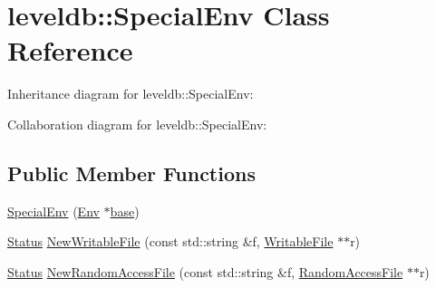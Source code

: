 \hypertarget{classleveldb_1_1_special_env}{}\section{leveldb\+:\+:Special\+Env Class Reference}
\label{classleveldb_1_1_special_env}


Inheritance diagram for leveldb\+:\+:Special\+Env\+:


Collaboration diagram for leveldb\+:\+:Special\+Env\+:
\subsection*{Public Member Functions}
\begin{DoxyCompactItemize}
\item 
\hyperlink{classleveldb_1_1_special_env_a29fed9502e35a1f9374e0f46f4bd1181}{Special\+Env} (\hyperlink{classleveldb_1_1_env}{Env} $\ast$\hyperlink{testharness_8cc_a70ff0f6c026c3dd1ef6aaf504e7fddc3}{base})
\item 
\hyperlink{classleveldb_1_1_status}{Status} \hyperlink{classleveldb_1_1_special_env_a2a8b88051ccc5f957321d47af0dae5ed}{New\+Writable\+File} (const std\+::string \&f, \hyperlink{classleveldb_1_1_writable_file}{Writable\+File} $\ast$$\ast$r)
\item 
\hyperlink{classleveldb_1_1_status}{Status} \hyperlink{classleveldb_1_1_special_env_ae04ba2b7b94753d805e316dbda74ec00}{New\+Random\+Access\+File} (const std\+::string \&f, \hyperlink{classleveldb_1_1_random_access_file}{Random\+Access\+File} $\ast$$\ast$r)
\end{DoxyCompactItemize}
